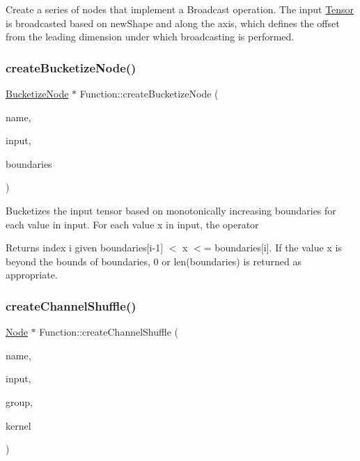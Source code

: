 Create a series of nodes that implement a Broadcast operation. The {\ttfamily input} \hyperlink{classglow_1_1_tensor}{Tensor} is broadcasted based on {\ttfamily new\+Shape} and along the {\ttfamily axis}, which defines the offset from the leading dimension under which broadcasting is performed. \mbox{\label{classglow_1_1_function_aa6412c6acdbc1e9c6ec002c841e071f7}} 
\subsubsection{\texorpdfstring{create\+Bucketize\+Node()}{createBucketizeNode()}}
{\footnotesize\ttfamily \hyperlink{classglow_1_1_bucketize_node}{Bucketize\+Node} $\ast$ Function\+::create\+Bucketize\+Node (\begin{DoxyParamCaption}\item[{llvm\+::\+String\+Ref}]{name,  }\item[{\hyperlink{structglow_1_1_node_value}{Node\+Value}}]{input,  }\item[{llvm\+::\+Array\+Ref$<$ float $>$}]{boundaries }\end{DoxyParamCaption})}

Bucketizes the input tensor based on monotonically increasing {\ttfamily boundaries} for each value in {\ttfamily input}. For each value x in input, the operator \begin{DoxyReturn}{Returns}
index i given boundaries\mbox{[}i-\/1\mbox{]} $<$ x $<$= boundaries\mbox{[}i\mbox{]}. If the value x is beyond the bounds of boundaries, 0 or len(boundaries) is returned as appropriate. 
\end{DoxyReturn}
\mbox{\label{classglow_1_1_function_a0a16974812ba2aaadd2ec5cf521ef1a0}} 
\subsubsection{\texorpdfstring{create\+Channel\+Shuffle()}{createChannelShuffle()}}
{\footnotesize\ttfamily \hyperlink{classglow_1_1_node}{Node} $\ast$ Function\+::create\+Channel\+Shuffle (\begin{DoxyParamCaption}\item[{llvm\+::\+String\+Ref}]{name,  }\item[{\hyperlink{structglow_1_1_node_value}{Node\+Value}}]{input,  }\item[{size\+\_\+t}]{group,  }\item[{size\+\_\+t}]{kernel }\end{DoxyParamCaption})}


